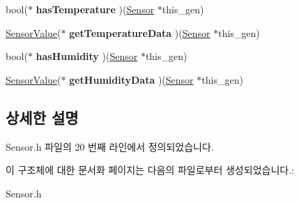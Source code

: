 \begin{DoxyCompactItemize}
\item 
\hypertarget{struct___sensor_a2713f9f8a1e651e7559cca145616fcea}{bool($\ast$ {\bfseries has\-Temperature} )(\hyperlink{struct___sensor}{Sensor} $\ast$this\-\_\-gen)}\label{struct___sensor_a2713f9f8a1e651e7559cca145616fcea}

\item 
\hypertarget{struct___sensor_ae1cd44628d8237c8e8d74cdfda35c171}{\hyperlink{struct___sensor_value}{Sensor\-Value}($\ast$ {\bfseries get\-Temperature\-Data} )(\hyperlink{struct___sensor}{Sensor} $\ast$this\-\_\-gen)}\label{struct___sensor_ae1cd44628d8237c8e8d74cdfda35c171}

\item 
\hypertarget{struct___sensor_acbd37cfc333377c618bf5fcca876ad55}{bool($\ast$ {\bfseries has\-Humidity} )(\hyperlink{struct___sensor}{Sensor} $\ast$this\-\_\-gen)}\label{struct___sensor_acbd37cfc333377c618bf5fcca876ad55}

\item 
\hypertarget{struct___sensor_a5bce405ec29437926cefdfe043e6f56d}{\hyperlink{struct___sensor_value}{Sensor\-Value}($\ast$ {\bfseries get\-Humidity\-Data} )(\hyperlink{struct___sensor}{Sensor} $\ast$this\-\_\-gen)}\label{struct___sensor_a5bce405ec29437926cefdfe043e6f56d}

\end{DoxyCompactItemize}


\subsection{상세한 설명}


Sensor.\-h 파일의 20 번째 라인에서 정의되었습니다.



이 구조체에 대한 문서화 페이지는 다음의 파일로부터 생성되었습니다.\-:\begin{DoxyCompactItemize}
\item 
Sensor.\-h\end{DoxyCompactItemize}
